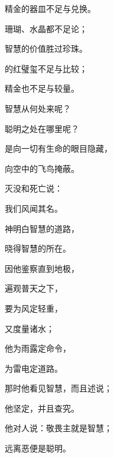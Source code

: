 {\par }{\Q 精金的器皿不足与兑换。
\par }{\Q {}珊瑚、水晶都不足论；
\par }{\Q 智慧的价值胜过珍珠。
\par }{\Q {}的红璧玺不足与比较；
\par }{\Q 精金也不足与较量。
\par }{\BB \par }{\Q {}智慧从何处来呢？
\par }{\Q 聪明之处在哪里呢？
\par }{\Q {}是向一切有生命的眼目隐藏，
\par }{\Q 向空中的飞鸟掩蔽。
\par }{\Q {}灭没和死亡说：
\par }{\Q 我们风闻其名。
\par }{\BB \par }{\Q {}神明白智慧的道路，
\par }{\Q 晓得智慧的所在。
\par }{\Q {}因他鉴察直到地极，
\par }{\Q 遍观普天之下，
\par }{\Q {}要为风定轻重，
\par }{\Q 又度量诸水；
\par }{\Q {}他为雨露定命令，
\par }{\Q 为雷电定道路。
\par }{\Q {}那时他看见智慧，而且述说；
\par }{\Q 他坚定，并且查究。
\par }{\Q {}他对人说：敬畏主就是智慧；
\par }{\Q 远离恶便是聪明。

}
